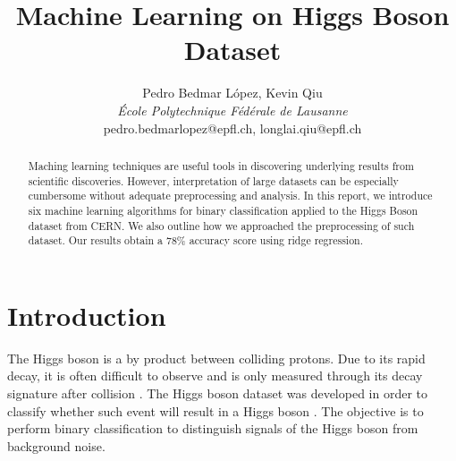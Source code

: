 \documentclass[10pt,conference,compsocconf]{IEEEtran}
\begin{document}
\title{Machine Learning on Higgs Boson Dataset}

\author{
  {Pedro Bedmar L\'opez, Kevin Qiu} \\
  \textit{École Polytechnique Fédérale de Lausanne} \\
  pedro.bedmarlopez@epfl.ch, longlai.qiu@epfl.ch}
\maketitle

\begin{abstract}
  Maching learning techniques are useful tools in discovering underlying results from scientific discoveries. However, interpretation of large datasets can be especially cumbersome without adequate preprocessing and analysis. In this report, we introduce six machine learning algorithms for binary classification applied to the Higgs Boson dataset from CERN. We also outline how we approached the preprocessing of such dataset. Our results obtain a 78\% accuracy score using ridge regression.
  
\end{abstract}

\section{Introduction}
\label{sec:intro}

The Higgs boson is a by product between colliding protons. Due to its rapid decay, it is often difficult to observe and is only measured through its decay signature after collision \cite{higgs}. The Higgs boson dataset was developed in order to classify whether such event will result in a Higgs boson \cite{higgs}. The objective is to perform binary classification to distinguish signals of the Higgs boson from background noise.

\end{document}
